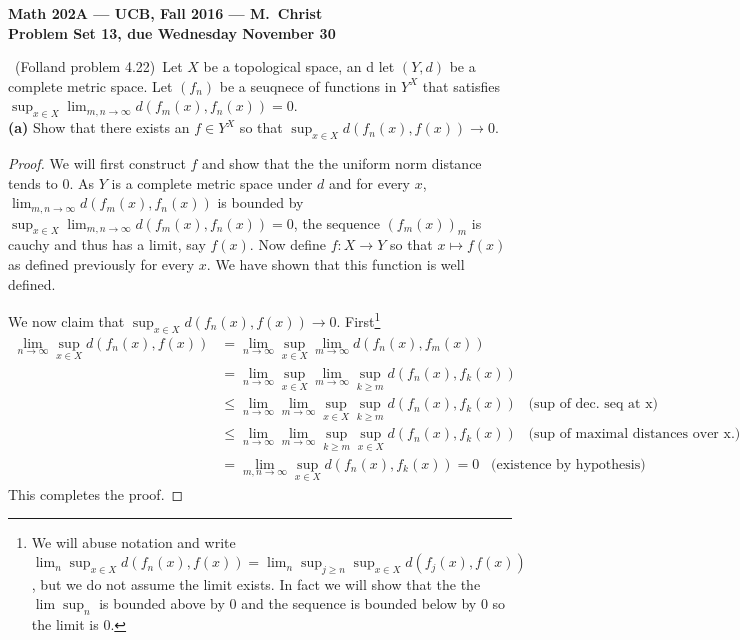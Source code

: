 \documentclass[11pt]{amsart}
\theoremstyle{definition}
\numberwithin{theorem}{section}
\numberwithin{definition}{section}
\numberwithin{equation}{section}
\begin{document}
\begin{center}{\bf Math 202A --- UCB, Fall 2016 --- M.~Christ}
\\
{\bf Problem Set 13, due Wednesday November 30}
\end{center}

\medskip {}\ (Folland problem 4.22)\ 
Let $X$ be a topological space, an d let $(Y, d)$ be a complete metric space.
Let $(f_n)$ be a seuqnece of functions in $Y^X$ that satisfies
$\sup_{x\in X} \lim_{m,n\to\infty} d(f_m(x), f_n(x)) = 0$. \\
\noindent \textbf{(a)} Show that there exists an $f \in Y^X$ so that
$\sup_{x\in X} d(f_n(x), f(x)) \to 0.$
\begin{proof}
	We will first construct $f$ and show that the the uniform norm distance tends to $0$. 
	As $Y$ is a complete metric space under $d$ and for every $x$, $\lim_{m,n\to\infty} d(f_m(x), f_n(x))$
	is bounded by $\sup_{x\in X} \lim_{m,n\to\infty} d(f_m(x), f_n(x)) = 0$, the sequence $(f_m(x))_m$ is cauchy
	and thus has a limit, say $f(x).$ Now define $f: X \to Y$ so that $x \mapsto f(x)$ as defined previously for every
	$x$. We have shown that this function is well defined.

	We now claim that $\sup_{x\in X} d(f_n(x), f(x)) \to 0.$ First\footnote{We will abuse notation and 
	write $\lim_n \sup_{x \in X} d(f_n(x), f(x)) = \lim_n\sup_{j\geq n} \sup_{x \in X} d(f_j(x), f(x))$, but we 
	do not assume the limit exists. In fact we will show that the the $\lim \sup_n$ is bounded above by $0$ and the sequence is bounded below by $0$ so the limit is $0.$ }
 	\begin{equation*}
		\begin{aligned}
		\lim_{n\to \infty }\sup_{x \in X} d(f_n(x), f(x)) &=  \lim_{n\to \infty }\sup_{x \in X} \lim_{m\to \infty}d(f_n(x), f_m(x)) \\
		&= \lim_{n\to \infty }\sup_{x \in X} \lim_{m\to \infty}  \sup_{k \geq m} d(f_n(x), f_k(x)) \\
		&\leq \lim_{n\to \infty }\lim_{m\to \infty}  \sup_{x \in X}  \sup_{k \geq m} d(f_n(x), f_k(x)) \;\;\;\text{(sup of dec. seq at x)} \\
		&\leq \lim_{n\to \infty }\lim_{m\to \infty}  \sup_{k \geq m} \sup_{x \in X}   d(f_n(x), f_k(x)) \;\;\;\text{(sup of maximal distances over x.)} \\
		& = \lim_{m,n\to \infty }  \sup_{x \in X}   d(f_n(x), f_k(x)) = 0 \;\;\;\text{(existence by hypothesis)}
		\end{aligned}
	\end{equation*}
	This completes the proof. 
\end{proof}
\end{document}
